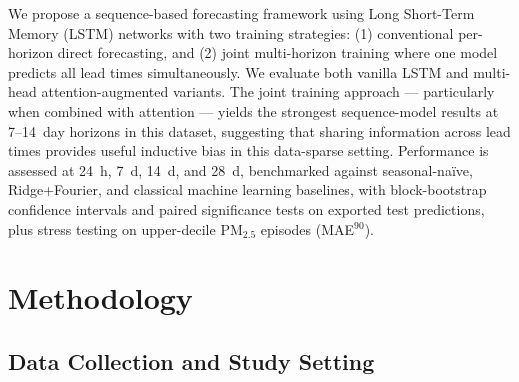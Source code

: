 \documentclass[a4paper,fleqn]{cas-sc}
\begin{document}



We propose a sequence-based forecasting framework using Long Short-Term Memory (LSTM) networks with two training strategies: (1) conventional per-horizon direct forecasting, and (2) joint multi-horizon training where one model predicts all lead times simultaneously. We evaluate both vanilla LSTM and multi-head attention-augmented variants. The joint training approach --- particularly when combined with attention --- yields the strongest sequence-model results at 7--14~day horizons in this dataset, suggesting that sharing information across lead times provides useful inductive bias in this data-sparse setting. Performance is assessed at 24~h, 7~d, 14~d, and 28~d, benchmarked against seasonal-na\"{i}ve, Ridge+Fourier, and classical machine learning baselines, with block-bootstrap confidence intervals and paired significance tests on exported test predictions, plus stress testing on upper-decile PM$_{2.5}$ episodes (MAE$^{90}$).





\section{Methodology}\label{sec2}

\subsection{Data Collection and Study Setting}
\end{document}
